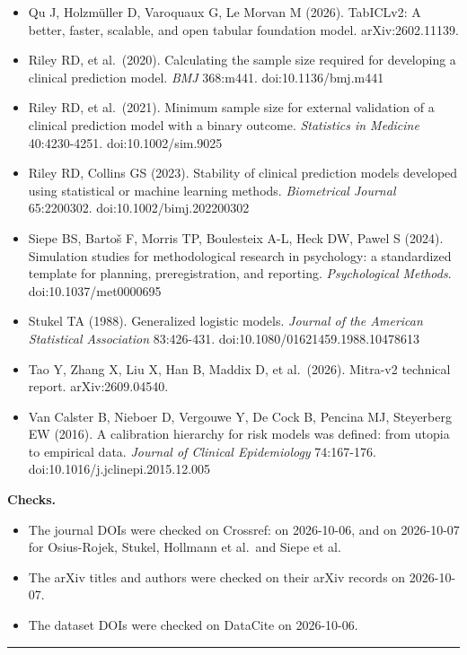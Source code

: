 \documentclass[
  10pt,
]{article}
\providecommand{\tightlist}{%
  \setlength{\itemsep}{0pt}\setlength{\parskip}{0pt}}
\begin{document}
\begin{itemize}
\item
  Qu J, Holzmüller D, Varoquaux G, Le Morvan M (2026).
  TabICLv2: A better, faster, scalable, and open tabular
  foundation model. arXiv:2602.11139.
\item
  Riley RD, et al.~(2020). Calculating the sample size
  required for developing a clinical prediction model.
  \emph{BMJ} 368:m441. doi:10.1136/bmj.m441
\item
  Riley RD, et al.~(2021). Minimum sample size for external
  validation of a clinical prediction model with a binary
  outcome. \emph{Statistics in Medicine} 40:4230-4251.
  doi:10.1002/sim.9025
\item
  Riley RD, Collins GS (2023). Stability of clinical
  prediction models developed using statistical or machine
  learning methods. \emph{Biometrical Journal} 65:2200302.
  doi:10.1002/bimj.202200302
\item
  Siepe BS, Bartoš F, Morris TP, Boulesteix A-L, Heck DW,
  Pawel S (2024). Simulation studies for methodological
  research in psychology: a standardized template for
  planning, preregistration, and reporting.
  \emph{Psychological Methods}. doi:10.1037/met0000695
\item
  Stukel TA (1988). Generalized logistic models.
  \emph{Journal of the American Statistical Association}
  83:426-431. doi:10.1080/01621459.1988.10478613
\item
  Tao Y, Zhang X, Liu X, Han B, Maddix D, et al.~(2026).
  Mitra-v2 technical report. arXiv:2609.04540.
\item
  Van Calster B, Nieboer D, Vergouwe Y, De Cock B, Pencina
  MJ, Steyerberg EW (2016). A calibration hierarchy for risk
  models was defined: from utopia to empirical data.
  \emph{Journal of Clinical Epidemiology} 74:167-176.
  doi:10.1016/j.jclinepi.2015.12.005
\end{itemize}

\textbf{Checks.}

\begin{itemize}
\tightlist
\item
  The journal DOIs were checked on Crossref: on 2026-10-06,
  and on 2026-10-07 for Osius-Rojek, Stukel, Hollmann et
  al.~and Siepe et al.
\item
  The arXiv titles and authors were checked on their arXiv
  records on 2026-10-07.
\item
  The dataset DOIs were checked on DataCite on 2026-10-06.
\end{itemize}

\begin{center}\rule{0.5\linewidth}{0.5pt}\end{center}
\end{document}
